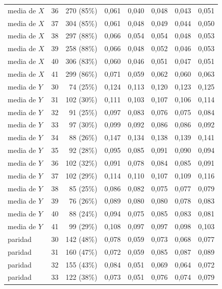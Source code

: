 \begin{table}[htbp]
{\begin{tabular}{@{}lrrrrrrr@{}}
        media de $X$ & 36 & 270 (85\%) & 0,061 & 0,040 & 0,048 & 0,043 & 0,051 \\
        media de $X$ & 37 & 304 (85\%) & 0,061 & 0,048 & 0,049 & 0,044 & 0,050 \\
        media de $X$ & 38 & 297 (88\%) & 0,066 & 0,054 & 0,054 & 0,048 & 0,053 \\
        media de $X$ & 39 & 258 (88\%) & 0,066 & 0,048 & 0,052 & 0,046 & 0,053 \\
        media de $X$ & 40 & 306 (83\%) & 0,060 & 0,046 & 0,051 & 0,047 & 0,051 \\
        media de $X$ & 41 & 299 (86\%) & 0,071 & 0,059 & 0,062 & 0,060 & 0,063 \\
        media de $Y$ & 30 & 74 (25\%) & 0,124 & 0,113 & 0,120 & 0,123 & 0,125 \\
        media de $Y$ & 31 & 102 (30\%) & 0,111 & 0,103 & 0,107 & 0,106 & 0,114 \\
        media de $Y$ & 32 & 91 (25\%) & 0,097 & 0,083 & 0,076 & 0,075 & 0,084 \\
        media de $Y$ & 33 & 97 (30\%) & 0,099 & 0,092 & 0,086 & 0,086 & 0,092 \\
        media de $Y$ & 34 & 88 (26\%) & 0,147 & 0,134 & 0,138 & 0,139 & 0,141 \\
        media de $Y$ & 35 & 92 (28\%) & 0,095 & 0,085 & 0,091 & 0,090 & 0,094 \\
        media de $Y$ & 36 & 102 (32\%) & 0,091 & 0,078 & 0,084 & 0,085 & 0,091 \\
        media de $Y$ & 37 & 102 (29\%) & 0,114 & 0,110 & 0,107 & 0,109 & 0,116 \\
        media de $Y$ & 38 & 85 (25\%) & 0,086 & 0,082 & 0,075 & 0,077 & 0,079 \\
        media de $Y$ & 39 & 76 (26\%) & 0,089 & 0,080 & 0,080 & 0,078 & 0,083 \\
        media de $Y$ & 40 & 88 (24\%) & 0,094 & 0,075 & 0,085 & 0,083 & 0,081 \\
        media de $Y$ & 41 & 99 (29\%) & 0,108 & 0,097 & 0,097 & 0,098 & 0,103 \\
        paridad & 30 & 142 (48\%) & 0,078 & 0,059 & 0,073 & 0,068 & 0,077 \\
        paridad & 31 & 160 (47\%) & 0,072 & 0,059 & 0,085 & 0,087 & 0,089 \\
        paridad & 32 & 155 (43\%) & 0,084 & 0,051 & 0,069 & 0,064 & 0,072 \\
        paridad & 33 & 122 (38\%) & 0,073 & 0,051 & 0,076 & 0,074 & 0,079 \\

\end{tabular}}
\end{table}
